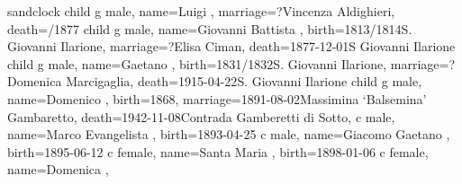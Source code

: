 \documentclass{article}
\begin{document}
\begin{midpage}
\begin{center}

\begin{genealogypicture}[
    processing=database,
    database format=full,
    node size=3.8cm,
    level size=2.8cm,
    level distance=6mm,
    list separators hang=3mm,
    name font=\bfseries,
    surn code={\textcolor{black!50!black}{#1}},
    place text={\newline}{},
    date format=d month yyyy,
    tcbset={male/.style={colframe=blue,colback=blue!5},
    female/.style={colframe=red,colback=red!5}},
    box={fit basedim=7pt,boxsep=2pt,segmentation style=solid,
        halign=left,before upper=\parskip1pt,
        \gtrDBsex,
    },
]
sandclock
{
    child{
        g{
            male,
            name={Luigi },
            marriage={?}{Vincenza Aldighieri},
            death={/1877}{}
        }
        child{
            g{
                male,
                name={Giovanni Battista },
                birth={1813/1814}{S. Giovanni Ilarione},
                marriage={?}{Elisa Ciman},
                death={1877-12-01}{S Giovanni Ilarione}
            }
            child{
                g{
                    male,
                    name={Gaetano },
                    birth={1831/1832}{S. Giovanni Ilarione},
                    marriage={?}{Domenica Marcigaglia},
                    death={1915-04-22}{S. Giovanni Ilarione}
                }
                child{
                    g{
                        male,
                        name={Domenico },
                        birth={1868}{},
                        marriage={1891-08-02}{Massimina `Balsemina' Gambaretto},
                        death={1942-11-08}{Contrada Gamberetti di Sotto},
                    }
                    c{
                        male,
                        name={Marco Evangelista },
                        birth={1893-04-25}{}
                    }
                    c{
                        male,
                        name={Giacomo Gaetano },
                        birth={1895-06-12}{}
                    }
                    c{
                        female,
                        name={Santa Maria },
                        birth={1898-01-06}{}
                    }
                    c{
                        female,
                        name={Domenica },
}}}}}}
\end{genealogypicture}
\end{center}
\end{midpage}
\end{document}
